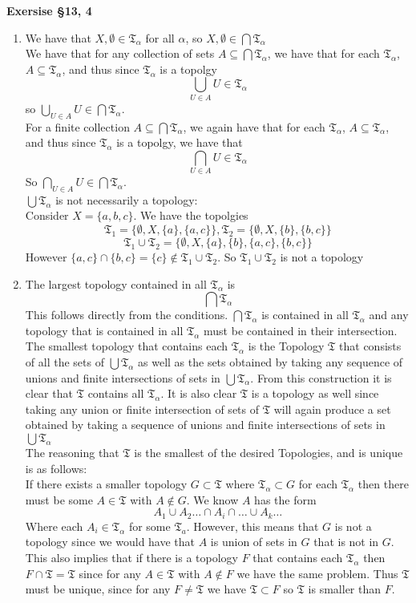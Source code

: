 \documentclass[12pt]{article}
\newenvironment{ques}[1]{\textbf{Exersise #1}\vspace{1 mm}\\ }{\bigskip}
\theoremstyle{definition}
\renewcommand{\a}{\alpha}
\newcommand{\T}{\mathfrak{T}}
\begin{document}
\begin{ques}{\S 13, 4}
	\begin{enumerate}
		\item
			We have that $X, \emptyset \in \T_\alpha$ for all $\alpha$,
			so $X, \emptyset \in \bigcap \T_\alpha$\\
			We have that for any collection of sets $A \subseteq
			\bigcap \T_\alpha$, we have that for  each
			$\T_\alpha$,  $A \subseteq \T_\alpha$, and thus since
			$\T_\alpha$ is a topolgy
			$$\bigcup_{U \in A} U \in \T_\alpha$$
			so $\bigcup_{U \in A} U \in \bigcap\T_\alpha$.\\
			For a finite collection $A \subseteq \bigcap
			\T_\alpha$, we again have that for  each
			$\T_\alpha$,  $A \subseteq \T_\alpha$, and thus since
			$\T_\alpha$ is a topolgy, we have that 
			$$\bigcap_{U \in A} U \in \T_\alpha$$
			So $\bigcap_{U \in A} U \in \bigcap\T_\alpha$.\\
			$\bigcup \T_\alpha$ is not necessarily a topology:\\
			Consider $X = \{a, b, c\}$. We have the topolgies
			$$\T_1 = \{ \emptyset, X, \{a\}, \{a, c\}\}, \T_2 = \{
			\emptyset, X, \{b\}, \{b, c\}\}$$
			$$\T_1 \cup \T_2 = \{ \emptyset, X, \{a\}, \{b\}, \{a,
			c\}, \{b, c\}\}$$
			However $\{a, c\} \cap \{b, c\} = \{c\} \notin \T_1
			\cup \T_2$. So $\T_1 \cup \T_2$ is not a topology
		\item
			The largest topology contained in all $\T_\alpha$ is 
			$$\bigcap \T_\alpha$$
			This follows directly from the conditions. $\bigcap
			\T_\alpha$ is contained in all $\T_\alpha$ and any
			topology that is contained in all $\T_\alpha$ must be
			contained in their intersection.\\
			The smallest topology that contains each $\T_\alpha$ is
			the Topology $\T$ that consists of all the sets of
			$\bigcup \T_\a $ as well as the sets obtained by taking
			any sequence of unions and finite intersections of
			sets in $\bigcup \T_\a $. From this construction it is clear that $\T$
			contains all $\T_\a$. It is also clear $\T$ is a
			topology as well since taking any union or finite
			intersection of sets of $\T$ will again produce a set obtained
			by taking a sequence of unions and finite
			intersections of sets in $\bigcup \T_\a$\\
			The reasoning that $\T$ is the smallest of the desired
			Topologies, and is unique is as follows:\\
			If there exists a smaller topology $G \subset \T$ where
			$\T_\a \subset G$ for each $\T_\a$ then there must be
			some $A \in \T$ with $A \notin G$. We know $A$ has the
			form
			$$A_1 \cup A_2 \dots \cap A_i \cap \dots \cup A_k
			\dots$$
			Where each $A_i \in \T_\a$ for some $\T_a$. However,
			this means that $G$ is not a topology since we would
			have that $A$ is union of sets in $G$ that is not in
			$G$. This also implies that if there is a topology $F$
			that contains each $\T_\a$ then $F \cap \T = \T$ since
			for any $A \in \T$ with $A \notin F$ we have the same
			problem. Thus $\T$ must be unique, since for any $F
			\neq \T$ we have $ \T \subset F$ so $\T$ is smaller
			than $F$.


\end{enumerate}
\end{ques}
\end{document}
